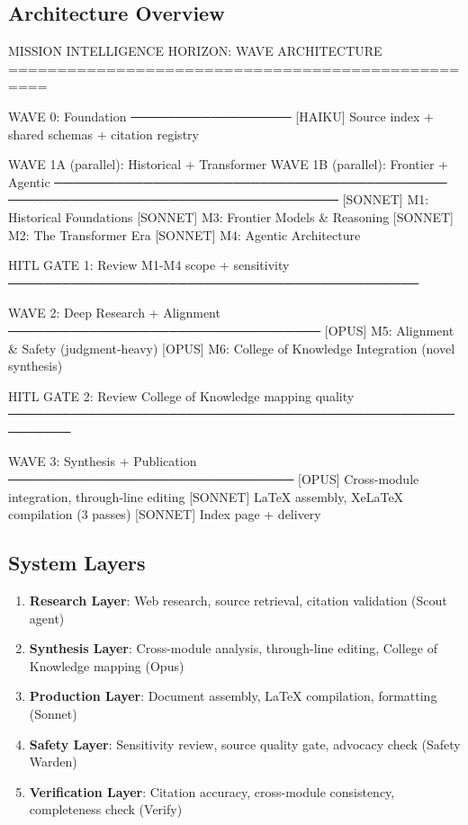 \documentclass[11pt,letterpaper]{article}
\begin{document}
\subsection{Architecture Overview}

\begin{asciibox}
   MISSION INTELLIGENCE HORIZON: WAVE ARCHITECTURE
   ==================================================

   WAVE 0: Foundation
   ──────────────────
   [HAIKU] Source index + shared schemas + citation registry

   WAVE 1A (parallel): Historical + Transformer   WAVE 1B (parallel): Frontier + Agentic
   ────────────────────────────────────────────   ─────────────────────────────────────
   [SONNET] M1: Historical Foundations            [SONNET] M3: Frontier Models & Reasoning
   [SONNET] M2: The Transformer Era               [SONNET] M4: Agentic Architecture

   HITL GATE 1: Review M1-M4 scope + sensitivity
   ──────────────────────────────────────────────

   WAVE 2: Deep Research + Alignment
   ───────────────────────────────────
   [OPUS] M5: Alignment & Safety (judgment-heavy)
   [OPUS] M6: College of Knowledge Integration (novel synthesis)

   HITL GATE 2: Review College of Knowledge mapping quality
   ─────────────────────────────────────────────────────────

   WAVE 3: Synthesis + Publication
   ────────────────────────────────
   [OPUS] Cross-module integration, through-line editing
   [SONNET] LaTeX assembly, XeLaTeX compilation (3 passes)
   [SONNET] Index page + delivery
\end{asciibox}

\subsection{System Layers}

\begin{enumerate}[leftmargin=*, label=\textbf{\arabic*.}]
\item \textbf{Research Layer}: Web research, source retrieval, citation validation (Scout agent)
\item \textbf{Synthesis Layer}: Cross-module analysis, through-line editing, College of Knowledge mapping (Opus)
\item \textbf{Production Layer}: Document assembly, LaTeX compilation, formatting (Sonnet)
\item \textbf{Safety Layer}: Sensitivity review, source quality gate, advocacy check (Safety Warden)
\item \textbf{Verification Layer}: Citation accuracy, cross-module consistency, completeness check (Verify)
\end{enumerate}
\end{document}
